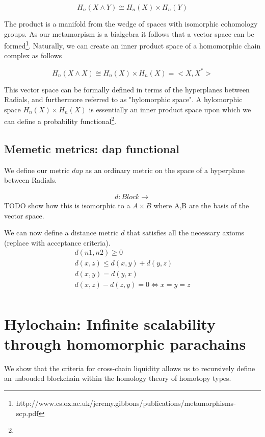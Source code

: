 \documentclass{article}
\begin{document}
\begin{equation} \label{eq1}
H_n(X \wedge Y) \cong H_n(X) \times H_n(Y)
\end{equation}

The product is a manifold from the wedge of spaces with isomorphic cohomology groups. As our metamorpism is a bialgebra it follows that a vector space can be formed\footnote{http://www.cs.ox.ac.uk/jeremy.gibbons/publications/metamorphisms-scp.pdf}. Naturally, we can create an inner product space of a homomorphic chain complex as follows

\begin{equation} \label{eq1}
H_n(X \wedge X) \cong H_n(X) \times H_n(X) = <X,X^*>
\end{equation}

This vector space can be formally defined in terms of the hyperplanes between Radials, and furthermore referred to as "hylomorphic space". A hylomorphic space $H_n(X) \times H_n(X)$ is essentially an inner product space upon which we can define a probability functional\footnote{}.

\subsection{Memetic metrics: dap functional}
We define our metric $dap$ as an ordinary metric on the space of a hyperplane between Radials.

\begin{equation} \label{eq1}
\begin{split}
d: Block \rightarrow 
\end{split}
\end{equation}
TODO show how this is isomorphic to a $A\times B$ where A,B are the basis of the vector space.

We can now define a distance metric $d$ that satisfies all the necessary axioms (replace with acceptance criteria).
\begin{equation} \label{eq1}
\begin{split}
d(n1, n2) \geq 0\\
d(x, z) \leq d(x, y) + d(y, z) \\
d(x, y) = d(y, x) \\
d(x, z) - d(z, y) = 0 \iff x = y = z\\
\end{split}
\end{equation}

\section{Hylochain: Infinite scalability through homomorphic parachains}
We show that the criteria for cross-chain liquidity allows us to recursively define an unbouded blockchain within the homology theory of homotopy types.
\end{document}
